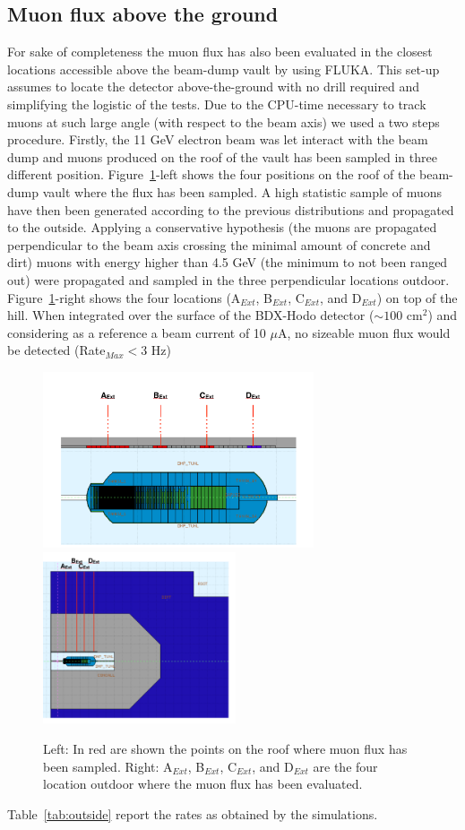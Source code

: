\subsection{Muon flux above the ground}
For sake of completeness the muon flux has also been evaluated in the closest locations accessible above the  beam-dump vault by using FLUKA.  This set-up assumes to locate the detector above-the-ground with no drill required  and simplifying the logistic of the tests.
Due to the CPU-time necessary to track muons at such large angle (with respect to the beam axis) we used a two steps procedure. Firstly, the 11 GeV electron beam was let interact with the beam dump and muons produced on the roof of the vault has been sampled in three different position. Figure~\ref{fig:bd-top}-left shows the four positions on the roof of the beam-dump vault where the flux has been sampled.
A high statistic sample of muons have then been generated according to the previous distributions and propagated to the outside.  Applying  a conservative hypothesis (the muons are propagated perpendicular to the beam axis  crossing the minimal amount of concrete and dirt) muons with energy higher than 4.5 GeV (the minimum to not been ranged out)  were propagated and sampled in the three perpendicular locations outdoor. Figure~\ref{fig:bd-top}-right shows the four locations (A$_{Ext}$, B$_{Ext}$, C$_{Ext}$,  and D$_{Ext}$) on top of the hill. When integrated over the surface of the BDX-Hodo detector ($\sim 100$ cm$^2$) and considering as a reference a beam current of 10 $\mu$A, no sizeable muon flux would be detected (Rate$_{Max}<$3 Hz)
\begin{figure}[h!] 
\center
\includegraphics[width=8.0cm]{figs/DumpTunnelTopBigger1.pdf}
\includegraphics[width=5.7cm]{figs/DumpTunnelTop1.pdf}
\caption {Left: In red are shown the points on the roof  where muon flux has been sampled. Right:  A$_{Ext}$, B$_{Ext}$, C$_{Ext}$,  and D$_{Ext}$ are the four location outdoor where the muon flux has been evaluated.}
\label{fig:bd-top}
\end{figure}
Table~\ref{tab:outside} report the rates as obtained by the simulations.

